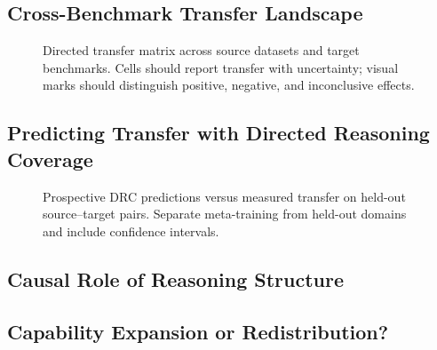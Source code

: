\subsection{Cross-Benchmark Transfer Landscape}
\label{sec:transfer-landscape}

\begin{figure}[t]
    \centering
    \caption{Directed transfer matrix across source datasets and target
    benchmarks.  Cells should report transfer with uncertainty; visual marks
    should distinguish positive, negative, and inconclusive effects.}
    \label{fig:transfer-heatmap}
\end{figure}


\subsection{Predicting Transfer with Directed Reasoning Coverage}
\label{sec:drc-results}

\begin{figure}[t]
    \centering
    \caption{Prospective DRC predictions versus measured transfer on held-out
    source--target pairs.  Separate meta-training from held-out domains and
    include confidence intervals.}
    \label{fig:drc-prediction}
\end{figure}


\subsection{Causal Role of Reasoning Structure}
\label{sec:causal-structure}


\subsection{Capability Expansion or Redistribution?}
\label{sec:capability-results}

